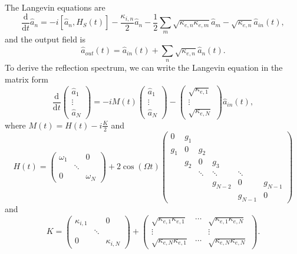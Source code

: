 \documentclass[
twocolumn,

superscriptaddress,









 amsmath,amssymb,
 aps,


prl,




]{revtex4-2}
\newcommand{\opa}{\hat{a}}
\newcommand{\oph}{\hat{H}}
\newcommand{\ddt}{\frac{\text{d}}{\text{d}t}}
\begin{document}
The Langevin equations are
\begin{equation}
	\ddt \opa_n = -i [\opa_n, \oph_S(t)] - \frac{\kappa_{i,n}}{2} \opa_n - \frac{1}{2} \sum_m \sqrt{\kappa_{e,n} \kappa_{e,m}} \opa_m - \sqrt{\kappa_{e,n}} \opa_{in} (t) ,
\end{equation}
and the output field is
\begin{equation}
	\opa_{out} (t) = \opa_{in} (t) + \sum_n \sqrt{\kappa_{e,n}} \opa_n (t) .
\end{equation}
To derive the reflection spectrum, we can write the Langevin equation in the matrix form
\begin{equation}
	\ddt \begin{pmatrix} \opa_1 \\ \vdots \\ \opa_N \end{pmatrix} = -i M(t) \begin{pmatrix} \opa_1 \\ \vdots \\ \opa_N \end{pmatrix} -
	\begin{pmatrix} \sqrt{\kappa_{e,1}} \\ \vdots \\ \sqrt{\kappa_{e,N}} \end{pmatrix} \opa_{in} (t) ,
\end{equation}
where $M(t) = H(t) - i \frac{K}{2}$ and
\begin{equation}
	H(t) = \begin{pmatrix} \omega_1 & & 0 \\ & \ddots & \\ 0 & & \omega_N \end{pmatrix} + 2 \cos (\Omega t)
	\begin{pmatrix}
		0 & g_1 & & & \\
		g_1 & 0 & g_2 & \\
		& g_2 & 0 & g_3 \\
		& & \ddots & \ddots & \ddots \\
		& & & g_{N-2} & 0 & g_{N-1} \\
		& & & & g_{N-1} & 0
	\end{pmatrix}
\end{equation}
and
\begin{equation}
	K = \begin{pmatrix} \kappa_{i,1} & & 0 \\ & \ddots & \\ 0 & & \kappa_{i,N} \end{pmatrix} +
	\begin{pmatrix}
		\sqrt{\kappa_{e,1} \kappa_{e,1}} & \cdots & \sqrt{\kappa_{e,1} \kappa_{e,N}} \\
		\vdots &  & \vdots \\
		\sqrt{\kappa_{e,N} \kappa_{e,1}} & \cdots & \sqrt{\kappa_{e,N} \kappa_{e,N}}
	\end{pmatrix} .
\end{equation}
\end{document}
